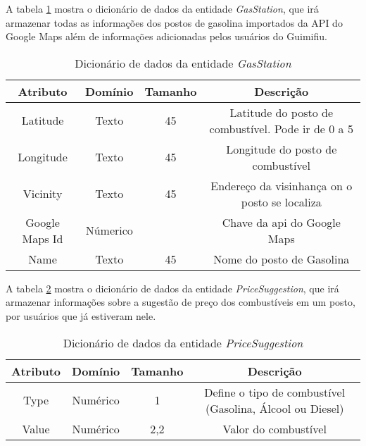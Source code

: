 A tabela \ref{dic:gas_station} mostra o dicionário de dados da entidade \textit{GasStation}, que irá armazenar todas as informações dos postos de gasolina importados da API do Google Maps além de informações adicionadas pelos usuários do Guimifiu.
\begin{table}[h]
\centering
\caption{Dicionário de dados da entidade \textit{GasStation}}
\label{dic:gas_station}
\begin{tabular}{cccc}
\toprule
\textbf{Atributo} & \textbf{Domínio} & \textbf{Tamanho} & \textbf{Descrição} \\
\midrule
Latitude                        & Texto                          & 45                             & Latitude do posto de combustível. Pode ir de 0 a 5                 \\
Longitude                       & Texto                          & 45                             & Longitude do posto de combustível\\
Vicinity                        & Texto                          & 45                             & Endereço da visinhança on o posto se localiza \\
Google Maps Id                  & Númerico                       &                                & Chave da api do Google Maps      \\
Name                            & Texto                          & 45                             & Nome do posto de Gasolina\\
\bottomrule
\end{tabular}
\end{table}

A tabela \ref{dic:pricesuggestion} mostra o dicionário de dados da entidade \textit{PriceSuggestion}, que irá armazenar informações sobre a sugestão de preço dos combustíveis em um posto, por usuários que já estiveram nele.
\begin{table}[h]
\centering
\caption{Dicionário de dados da entidade \textit{PriceSuggestion}}
\label{dic:pricesuggestion}
\begin{tabular}{cccc}
\toprule
\textbf{Atributo} & \textbf{Domínio} & \textbf{Tamanho} & \textbf{Descrição} \\
\midrule
Type                            & Numérico                       &1                               & Define o tipo de combustível (Gasolina, Álcool ou Diesel)\\
Value                           & Numérico                       &2,2                             & Valor do combustível\\
\bottomrule
\end{tabular}
\end{table}

